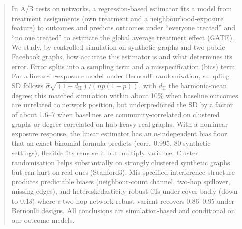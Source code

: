 \documentclass{article}
\theoremstyle{plain}
\theoremstyle{remark}
\newcommand{\dH}{d_{\mathrm H}}
\begin{document}
\printAffiliationsAndNotice{}

\begin{abstract}
In A/B tests on networks, a regression-based estimator fits a model from treatment assignments (own treatment and a neighbourhood-exposure feature) to outcomes and predicts outcomes under ``everyone treated'' and ``no one treated'' to estimate the global average treatment effect (GATE). We study, by controlled simulation on synthetic graphs and two public Facebook graphs, how accurate this estimator is and what determines its error. Error splits into a sampling term and a misspecification (bias) term. For a linear-in-exposure model under Bernoulli randomisation, sampling SD follows $\hat\sigma\sqrt{(1+\dH)/(np(1-p))}$, with $\dH$ the harmonic-mean degree; this matched simulation within about 10\% when baseline outcomes are unrelated to network position, but underpredicted the SD by a factor of about 1.6--7 when baselines are community-correlated on clustered graphs or degree-correlated on hub-heavy real graphs. With a nonlinear exposure response, the linear estimator has an $n$-independent bias floor that an exact binomial formula predicts (corr.\ 0.995, 80 synthetic settings); flexible fits remove it but multiply variance. Cluster randomisation helps substantially on strongly clustered synthetic graphs but can hurt on real ones (Stanford3). Mis-specified interference structure produces predictable biases (neighbour-count channel, two-hop spillover, missing edges), and heteroskedasticity-robust CIs under-cover badly (down to 0.18) where a two-hop network-robust variant recovers 0.86--0.95 under Bernoulli designs. All conclusions are simulation-based and conditional on our outcome models.
\end{abstract}
\end{document}
